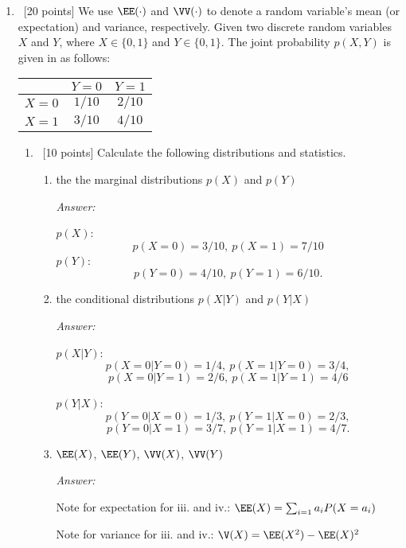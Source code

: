 \documentclass[12pt, fullpage,letterpaper]{article}
\begin{document}
\begin{enumerate}
\item~[20 points]  We use $\EE(\cdot)$ and $\VV(\cdot)$ to denote a random variable's mean (or expectation) and variance, respectively. Given two discrete random variables $X$ and $Y$, where $X \in \{0, 1\}$ and $Y \in \{0,1\}$. The joint probability $p(X,Y)$ is given in as follows:
\begin{table}[h]
        \centering
        \begin{tabular}{ccc}
        \hline\hline
         & $Y=0$ & $Y=1$ \\ \hline
         $X=0$ & $1/10$ & $2/10$ \\ \hline
         $X=1$  & $3/10$ & $4/10$ \\ \hline\hline
        \end{tabular}
\end{table}
	
\begin{enumerate}
    \item~[10 points] Calculate the following distributions and statistics. 
    \begin{enumerate}
    \item the the marginal distributions $p(X)$ and $p(Y)$

    \textit{Answer:} 

    $p(X)$: 
    \[p(X=0)=3/10,\ p(X=1)=7/10\]
    $p(Y)$: 
    \[p(Y=0)=4/10 ,\ p(Y=1)=6/10.\]

    \item the conditional distributions $p(X|Y)$ and $p(Y|X)$

    \textit{Answer:} 

    $p(X|Y)$: 
    \[p(X=0|Y=0)=1/4,\ p(X=1|Y=0)=3/4,\]
    \[p(X=0|Y=1)=2/6,\ p(X=1|Y=1)=4/6\]

    $p(Y|X)$: 
    \[p(Y=0|X=0)=1/3,\ p(Y=1|X=0)=2/3,\]
    \[p(Y=0|X=1)=3/7,\ p(Y=1|X=1)=4/7.\]

    \item $\EE(X)$, $\EE(Y)$, $\VV(X)$, $\VV(Y)$

    \textit{Answer:} 

    Note for expectation for iii. and iv.: $\EE(X) = \sum_{i=1} a_i P(X=a_i)$

    Note for variance for iii. and iv.: $\V(X) = \EE(X^2) - \EE(X)^2$


\end{enumerate}
\end{enumerate}
\end{enumerate}
\end{document}
